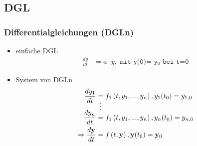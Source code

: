   \subsection{DGL}
  \begin{frame}
      \frametitle{Differentialgleichungen (DGLn)}
      \begin{itemize}
        \item einfache DGL
           \begin{align*}
             \frac{dy}{dt} &= a \cdot y,\texttt{ mit y(0)= y$_{0}$ bei t=0}
           \end{align*}
        \item System von DGLn
            \begin{align*}
               \frac{dy_{1}}{dt} &= f_{1}\left( t,y_{1},...,y_{n} \right), y_{1}(t_{0})=y_{1,0} \\
               & \shortvdotswithin{=}
               \frac{dy_{n}}{dt} &= f_{1}\left( t,y_{1},...,y_{n} \right), y_{n}(t_{0})=y_{n,0} \\
               \Rightarrow \frac{d\textbf{y}}{dt} &= f\left( t,\textbf{y} \right), \textbf{y}(t_{0})=\textbf{y$_{0}$} \\
             \end{align*}
       
      \end{itemize}
  \end{frame}


